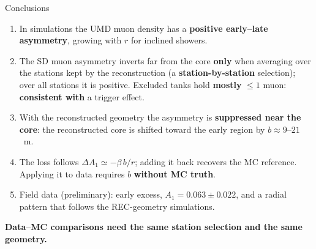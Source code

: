 \documentclass[aspectratio=169,11pt]{beamer}
\begin{document}
\begin{frame}[t]{Conclusions}
  \vspace{-0.3em}
  \small
  \begin{enumerate}
    \setlength{\itemsep}{0.05em}
    \item In simulations the UMD muon density has a \textbf{positive early--late
      asymmetry}, growing with $r$ for inclined showers.
    \item The SD muon asymmetry inverts far from the core \textbf{only} when averaging over
      the stations kept by the reconstruction (a \textbf{station-by-station} selection); over
      all stations it is positive. Excluded tanks hold \textbf{mostly} $\le1$ muon:
      \textbf{consistent with} a trigger effect.
    \item With the reconstructed geometry the asymmetry is \textbf{suppressed near the core}:
      the reconstructed core is shifted toward the early region by $b\approx9$--$21$~m.
    \item The loss follows $\Delta A_1\simeq-\beta\,b/r$; adding it back recovers the MC
      reference. Applying it to data requires $b$ \textbf{without MC truth}.
    \item Field data (preliminary): early excess, $A_1=0.063\pm0.022$, and a radial pattern
      that follows the REC-geometry simulations.
  \end{enumerate}
  \vspace{0.1em}
  \centering\alert{\textbf{Data--MC comparisons need the same station selection and the
  same geometry.}}


\end{frame}
\end{document}
